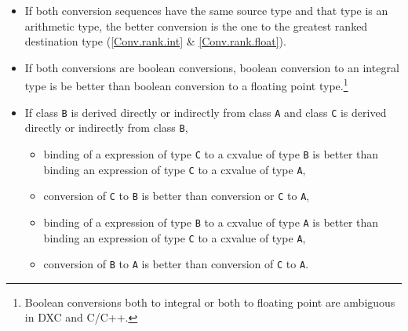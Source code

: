\begin{itemize}
  \item If both conversion sequences have the same source type and that type is
  an arithmetic type, the better conversion is the one to the greatest ranked
  destination type (\ref{Conv.rank.int} \& \ref{Conv.rank.float}).
  \item If both conversions are boolean conversions, boolean conversion to an
  integral type is be better than boolean conversion to a floating point
  type.\footnote{Boolean conversions both to integral or both to floating point
  are ambiguous in DXC and C/C++.}
  \item If class \texttt{B} is derived directly or indirectly from class
  \texttt{A} and class \texttt{C} is derived directly or indirectly from class
  \texttt{B},
  \begin{itemize}
    \item binding of a expression of type \texttt{C} to a cxvalue of type
    \texttt{B} is better than binding an expression of type \texttt{C} to a
    cxvalue of type \texttt{A},
    \item conversion of \texttt{C} to \texttt{B} is better than conversion or
    \texttt{C} to \texttt{A},
    \item binding of a expression of type \texttt{B} to a cxvalue of type
    \texttt{A} is better than binding an expression of type \texttt{C} to a
    cxvalue of type \texttt{A},
    \item conversion of \texttt{B} to \texttt{A} is better than conversion of
    \texttt{C} to \texttt{A}.
  \end{itemize}
\end{itemize}
